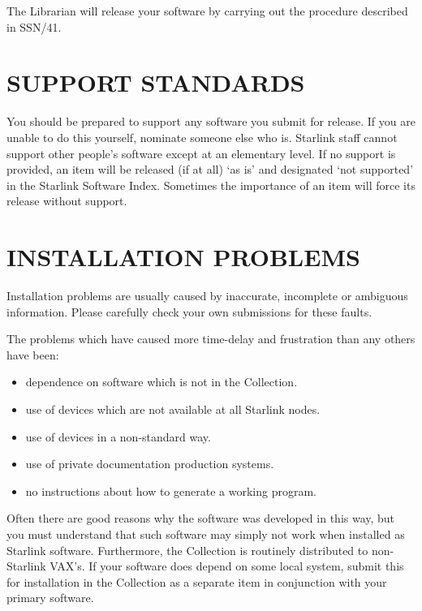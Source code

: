 The Librarian will release your software by carrying out the procedure described
in SSN/41.
\section {SUPPORT STANDARDS}
You should be prepared to support any software you submit for release.
If you are unable to do this yourself, nominate someone else who is.
Starlink staff cannot support other people's software except at an elementary
level.
If no support is provided, an item will be released (if at all) `as is' and
designated `not supported' in the Starlink Software Index.
Sometimes the importance of an item will force its release without support.
\section {INSTALLATION PROBLEMS}
Installation problems are usually caused by inaccurate, incomplete or ambiguous
information.
Please carefully check your own submissions for these faults.

The problems which have caused more time-delay and frustration than any others
have been:
\begin{itemize}
\item dependence on software which is not in the Collection.
\item use of devices which are not available at all Starlink nodes.
\item use of devices in a non-standard way.
\item use of private documentation production systems.
\item no instructions about how to generate a working program.
\end{itemize}
Often there are good reasons why the software was developed in this way, but you
must understand that such software may simply not work when installed as
Starlink software.
Furthermore, the Collection is routinely distributed to non-Starlink VAX's.
If your software does depend on some local system, submit this for installation
in the Collection as a separate item in conjunction with your primary software.
